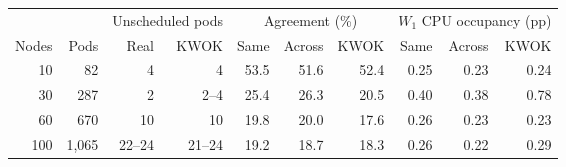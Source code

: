 \begin{tabular}{rrrrrrrrrr}
\toprule
 & & \multicolumn{2}{c}{Unscheduled pods} & \multicolumn{3}{c}{Agreement (\%)} & \multicolumn{3}{c}{$W_1$ CPU occupancy (pp)}\\
\cmidrule(lr){3-4}\cmidrule(lr){5-7}\cmidrule(lr){8-10}
Nodes & Pods & Real & KWOK & Same & Across & KWOK & Same & Across & KWOK\\
\midrule
10 & 82 & 4 & 4 & 53.5 & 51.6 & 52.4 & 0.25 & 0.23 & 0.24\\
30 & 287 & 2 & 2--4 & 25.4 & 26.3 & 20.5 & 0.40 & 0.38 & 0.78\\
60 & 670 & 10 & 10 & 19.8 & 20.0 & 17.6 & 0.26 & 0.23 & 0.23\\
100 & 1,065 & 22--24 & 21--24 & 19.2 & 18.7 & 18.3 & 0.26 & 0.22 & 0.29\\
\bottomrule
\end{tabular}
